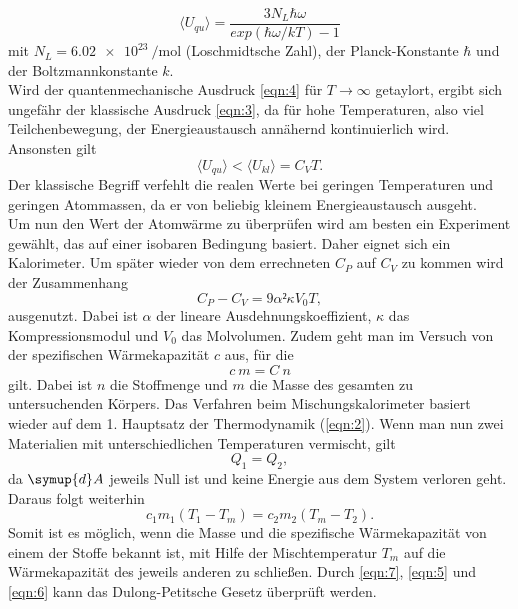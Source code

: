\begin{equation}
  \langle U_{qu} \rangle = \frac{3N_L\hbar\omega}{exp(\hbar\omega/kT)-1}
  \label{eqn:4}
\end{equation}
mit $N_L = \SI{6,02e23}{\per\mol}$ (Loschmidtsche Zahl), der Planck-Konstante $\hbar$ und der Boltzmannkonstante $k$.\\
Wird der quantenmechanische Ausdruck \ref{eqn:4} für $T\to\infty $ getaylort, ergibt sich ungefähr der klassische Ausdruck \ref{eqn:3}, da für hohe Temperaturen, also viel Teilchenbewegung, der Energieaustausch annähernd kontinuierlich wird.
Ansonsten gilt
\begin{equation}
  \langle U_{qu} \rangle < \langle U_{kl} \rangle = C_VT.
\end{equation}
Der klassische Begriff verfehlt die realen Werte bei geringen Temperaturen und geringen Atommassen, da er von beliebig kleinem Energieaustausch ausgeht.\\
Um nun den Wert der Atomwärme zu überprüfen wird am besten ein Experiment gewählt, das auf einer isobaren Bedingung basiert.
Daher eignet sich ein Kalorimeter.
Um später wieder von dem errechneten $C_P$ auf $C_V$ zu kommen wird der Zusammenhang
\begin{equation}
  C_P - C_V = 9 \alpha² \kappa V_0 T,
  \label{eqn:5}
\end{equation}
ausgenutzt.
Dabei ist $\alpha$ der lineare Ausdehnungskoeffizient, $\kappa$ das Kompressionsmodul und $V_0$ das Molvolumen.
Zudem geht man im Versuch von der spezifischen Wärmekapazität $c$ aus, für die
\begin{equation}
  c\:m = C\: n
  \label{eqn:6}
\end{equation}
gilt.
Dabei ist $n$ die Stoffmenge und $m$ die Masse des gesamten zu untersuchenden Körpers.
Das Verfahren beim Mischungskalorimeter basiert wieder auf dem 1. Hauptsatz der Thermodynamik (\ref{eqn:2}).
Wenn man nun zwei Materialien mit unterschiedlichen Temperaturen vermischt, gilt
\begin{equation}
  Q_1 = Q_2,
\end{equation}
da $\symup{d}A$ jeweils Null ist und keine Energie aus dem System verloren geht.
Daraus folgt weiterhin
\begin{equation}
  c_1m_1(T_1-T_m) = c_2m_2(T_m-T_2).
  \label{eqn:7}
\end{equation}
Somit ist es möglich, wenn die Masse und die spezifische Wärmekapazität von einem der Stoffe bekannt ist, mit Hilfe der Mischtemperatur $T_m$ auf die Wärmekapazität des jeweils anderen zu schließen.
Durch \ref{eqn:7}, \ref{eqn:5} und \ref{eqn:6} kann das Dulong-Petitsche Gesetz überprüft werden.


\cite{V201}

